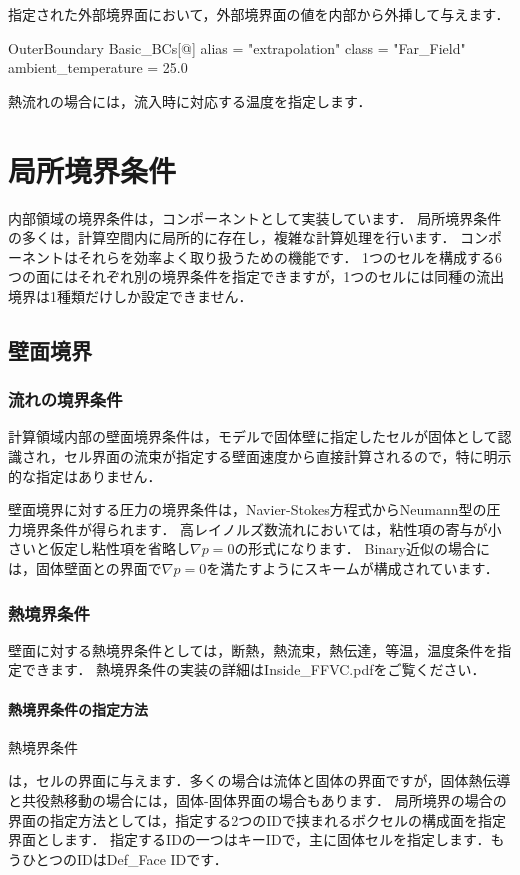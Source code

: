 \vspace{2mm}

指定された外部境界面において，外部境界面の値を内部から外挿して与えます．

{\small
\begin{program}
OuterBoundary {
  Basic_BCs[@] {
    alias    = "extrapolation"
    class    = "Far_Field"
    ambient_temperature = 25.0
  }
}
\end{program}
}

熱流れの場合には，流入時に対応する温度を指定します．



\pagebreak
\section{局所境界条件}
内部領域の境界条件は，コンポーネントとして実装しています．
局所境界条件の多くは，計算空間内に局所的に存在し，複雑な計算処理を行います．
コンポーネントはそれらを効率よく取り扱うための機能です．
1つのセルを構成する6つの面にはそれぞれ別の境界条件を指定できますが，1つのセルには同種の流出境界は1種類だけしか設定できません．

%
\subsection{壁面境界}

\subsubsection{流れの境界条件}
計算領域内部の壁面境界条件は，モデルで固体壁に指定したセルが固体として認識され，セル界面の流束が指定する壁面速度から直接計算されるので，特に明示的な指定はありません．

壁面境界に対する圧力の境界条件は，Navier-Stokes方程式からNeumann型の圧力境界条件が得られます．
高レイノルズ数流れにおいては，粘性項の寄与が小さいと仮定し粘性項を省略し$\nabla p=0$の形式になります．
Binary近似の場合には，固体壁面との界面で$\nabla p=0$を満たすようにスキームが構成されています．

%
\subsubsection{熱境界条件}
壁面に対する熱境界条件としては，断熱，熱流束，熱伝達，等温，温度条件を指定できます．
熱境界条件の実装の詳細はInside\_FFVC.pdfをご覧ください．

%
\paragraph{熱境界条件の指定方法}
\hypertarget{tgt:spec of heat bc}{熱境界条件}は，セルの界面に与えます．多くの場合は流体と固体の界面ですが，固体熱伝導と共役熱移動の場合には，固体-固体界面の場合もあります．
局所境界の場合の界面の指定方法としては，指定する2つのIDで挟まれるボクセルの構成面を指定界面とします．
指定するIDの一つはキーIDで，主に固体セルを指定します．もうひとつのIDはDef\_Face IDです．


